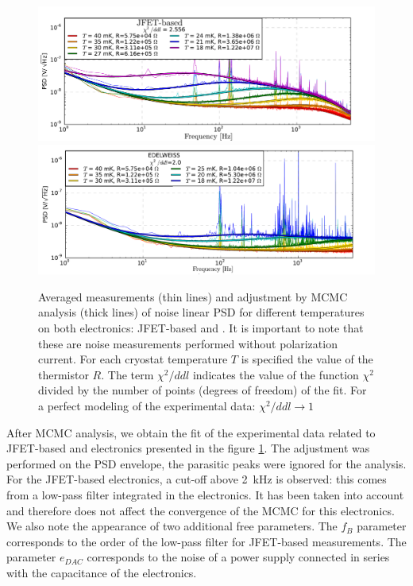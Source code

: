 \begin{figure}
\begin{center}
\includegraphics[width=\textwidth]{Figures/Ethem/cuore_fit_fin.pdf}
\includegraphics[width=\textwidth]{Figures/Ethem/edel_fit_fin.pdf}
\end{center}
\caption{Averaged measurements (thin lines) and adjustment by MCMC analysis (thick lines) of noise linear PSD for different temperatures on both electronics: JFET-based and \Edelweiss{}. It is important to note that these are noise measurements performed without polarization current. For each cryostat temperature $T$ is specified the value of the thermistor $R$. The term $\chi^2/ddl$ indicates the value of the function $\chi^2$ divided by the number of points (degrees of freedom) of the fit. For a perfect modeling of the experimental data: $\chi^2/ddl \rightarrow 1$}
\label{fig:rainbow-plot}
\end{figure}

After MCMC analysis, we obtain the fit of the experimental data related to JFET-based and \Edelweiss{} electronics presented in the figure \ref{fig:rainbow-plot}. The adjustment was performed on the PSD envelope, the parasitic peaks were ignored for the analysis. For the JFET-based electronics, a cut-off above \SI{2}{\kilo\Hz} is observed: this comes from a low-pass filter integrated in the electronics. It has been taken into account and therefore does not affect the convergence of the MCMC for this electronics. We also note the appearance of two additional free parameters. The $f_B$ parameter corresponds to the order of the low-pass filter for JFET-based measurements. The parameter $e_{DAC}$ corresponds to the noise of a power supply connected in series with the capacitance of the \Edelweiss{} electronics. 

